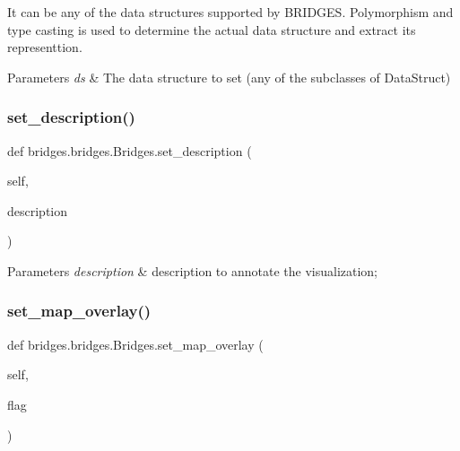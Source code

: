 It can be any of the data structures supported by B\+R\+I\+D\+G\+ES. Polymorphism and type casting is used to determine the actual data structure and extract its representtion.


\begin{DoxyParams}{Parameters}
{\em ds} & The data structure to set (any of the subclasses of Data\+Struct) \\
\hline
\end{DoxyParams}
\mbox{\label{classbridges_1_1bridges_1_1_bridges_aba86088c031b505bbe88dbc530bf1331}} 
\subsubsection{\texorpdfstring{set\+\_\+description()}{set\_description()}}
{\footnotesize\ttfamily def bridges.\+bridges.\+Bridges.\+set\+\_\+description (\begin{DoxyParamCaption}\item[{}]{self,  }\item[{}]{description }\end{DoxyParamCaption})}


\begin{DoxyParams}{Parameters}
{\em description} & description to annotate the visualization; \\
\hline
\end{DoxyParams}
\mbox{\label{classbridges_1_1bridges_1_1_bridges_ae9ed34b5878d9d120949da0b7e4d2911}} 
\subsubsection{\texorpdfstring{set\+\_\+map\+\_\+overlay()}{set\_map\_overlay()}}
{\footnotesize\ttfamily def bridges.\+bridges.\+Bridges.\+set\+\_\+map\+\_\+overlay (\begin{DoxyParamCaption}\item[{}]{self,  }\item[{}]{flag }\end{DoxyParamCaption})}

